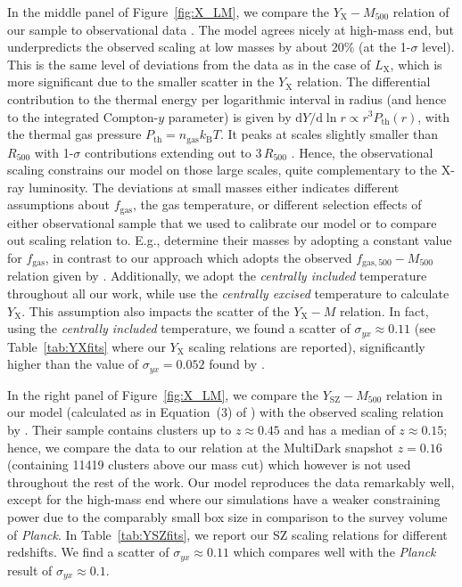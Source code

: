 \documentclass[traditabstract]{aa}
\newcommand{\rmn}{\mathrm}
\newcommand{\dd}{\mathrm{d}}
\begin{document}
In the middle panel of Figure~\ref{fig:X_LM}, we compare the
$Y_{\rmn{X}}-M_{500}$ relation of our sample to observational data
\citep{2010MNRAS.406.1773M}. The model agrees nicely at high-mass end, but
underpredicts the observed scaling at low masses by about $20\%$ (at the
1-$\sigma$ level). This is the same level of deviations from the data as in the
case of $L_{\rmn{X}}$, which is more significant due to the smaller scatter in
the $Y_{\rmn{X}}$ relation. The differential contribution to the thermal energy
per logarithmic interval in radius (and hence to the integrated Compton-$y$
parameter) is given by $\dd Y /\dd\ln r \propto r^3 P_{\rmn{th}}(r)$, with the
thermal gas pressure $P_{\rmn{th}}=n_{\rmn{gas}}k_{\rmn{B}}T$. It peaks at
scales slightly smaller than $R_{500}$ with 1-$\sigma$ contributions extending
out to $3\,R_{500}$ \citep{2010ApJ...725...91B}. Hence, the observational
scaling constrains our model on those large scales, quite complementary to the
X-ray luminosity. The deviations at small masses either indicates different
assumptions about $f_{\rmn{gas}}$, the gas temperature, or different selection
effects of either observational sample that we used to calibrate our model or to
compare out scaling relation to. E.g., \cite{2010MNRAS.406.1773M} determine
their masses by adopting a constant value for $f_{\rmn{gas}}$, in contrast to
our approach which adopts the observed $f_{\rmn{gas},500}-M_{500}$ relation
given by \cite{2009ApJ...693.1142S}. Additionally, we adopt the \emph{centrally
  included} temperature \cite{2010MNRAS.406.1773M} throughout all our work,
while \cite{2010MNRAS.406.1773M} use the \emph{centrally excised} temperature to
calculate $Y_{\rmn{X}}$. This assumption also impacts the scatter of the
$Y_{\rmn{X}}-M$ relation. In fact, using the \emph{centrally included}
temperature, we found a scatter of $\sigma_{yx} \approx 0.11$ (see
Table~\ref{tab:YXfits} where our $Y_{\rmn{X}}$ scaling relations are reported),
significantly higher than the value of $\sigma_{yx} = 0.052$ found by
\cite{2010MNRAS.406.1773M}.

In the right panel of Figure~\ref{fig:X_LM}, we compare the
$Y_{\rmn{SZ}}-M_{500}$ relation in our model (calculated as in Equation~(3) of
\citealp{2011arXiv1109.3709B}) with the observed scaling relation
by \cite{2011A&A...536A..11P}. Their sample contains clusters up to $z \approx
0.45$ and has a median of $z \approx 0.15$; hence, we compare the data to our
relation at the MultiDark snapshot $z=0.16$ (containing 11419 clusters above our mass cut) 
which however is not used throughout the rest of the work. Our model reproduces the data remarkably well, 
except for  the high-mass end where our simulations have a weaker constraining power due to the comparably 
small box size in comparison to the survey volume of {\em Planck}. In Table~\ref{tab:YSZfits},
we report our SZ scaling relations for different redshifts. We find a scatter
of $\sigma_{yx} \approx 0.11$ which compares well with the \emph{Planck} result
of $\sigma_{yx} \approx 0.1$.
 
\end{document}
